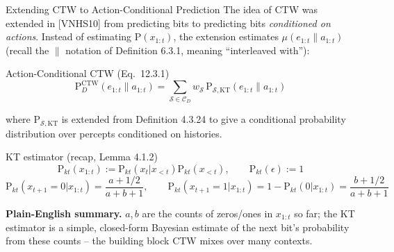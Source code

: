 \documentclass[aspectratio=169,10pt]{beamer}
\newcommand{\Scal}{\mathcal{S}}
\newcommand{\CD}{\mathcal{C}_D}
\newcommand{\Pkt}{\mathrm{P}_{kt}}
\begin{document}
\begin{frame}{Extending CTW to Action-Conditional Prediction}
\small
The idea of CTW was extended in [VNHS10] from predicting bits to predicting bits
\emph{conditioned on actions}. Instead of estimating $\mathrm{P}(x_{1:t})$, the extension
estimates $\mu(e_{1:t}\|a_{1:t})$ (recall the $\|$ notation of Definition 6.3.1, meaning
``interleaved with''):
\begin{block}{Action-Conditional CTW (Eq.\ 12.3.1)}
$$\mathrm{P}_D^{\mathrm{CTW}}(e_{1:t}\|a_{1:t}) = \sum_{\Scal\in\CD} w_\Scal\,
\mathrm{P}_{\Scal,\mathrm{KT}}(e_{1:t}\|a_{1:t})$$
\end{block}
where $\mathrm{P}_{\Scal,\mathrm{KT}}$ is extended from Definition 4.3.24 to give a
conditional probability distribution over percepts conditioned on histories.
\begin{block}{KT estimator (recap, Lemma 4.1.2)}
$$\Pkt(x_{1:t}) := \Pkt(x_t|x_{<t})\Pkt(x_{<t}),\qquad \Pkt(\epsilon):=1$$
$$\Pkt(x_{t+1}{=}0|x_{1:t}) = \frac{a+1/2}{a+b+1}, \qquad
\Pkt(x_{t+1}{=}1|x_{1:t}) = 1-\Pkt(0|x_{1:t}) = \frac{b+1/2}{a+b+1}$$
\end{block}
\textbf{Plain-English summary.} $a,b$ are the counts of zeros/ones in $x_{1:t}$ so far;
the KT estimator is a simple, closed-form Bayesian estimate of the next bit's probability
from these counts -- the building block CTW mixes over many contexts.
\end{frame}
\end{document}
